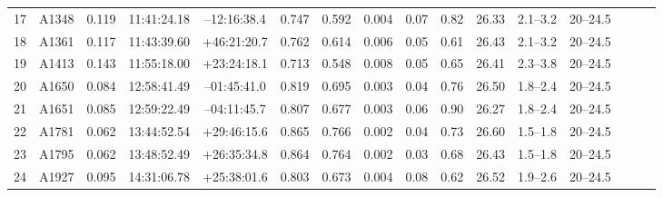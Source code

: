 \documentclass[useAMS,usenatbib]{mnras}
\begin{document}
\begin{table}
\begin{tabular*}{1.0\textwidth}{ l l c c c r c c c c c c c c l l }
17 & A1348 & 0.119 & 11:41:24.18 & \hspace{1.5pt}--\hspace{0.5pt}12:16:38.4 & 0.747 & 0.592 & 0.004 \hspace{8pt}& 0.07 & 0.82 & 26.33 \hspace{8pt}& 2.1--3.2 \hspace{8pt}& 20--24.5 \\
18 & A1361 & 0.117 & 11:43:39.60 & +46:21:20.7 & 0.762 & 0.614 & 0.006 \hspace{8pt}& 0.05 & 0.61 & 26.43 \hspace{8pt}& 2.1--3.2 \hspace{8pt}& 20--24.5 \\
19 & A1413 & 0.143 & 11:55:18.00 & +23:24:18.1 & 0.713 & 0.548 & 0.008 \hspace{8pt}& 0.05 & 0.65 & 26.41 \hspace{8pt}& 2.3--3.8 \hspace{8pt}& 20--24.5 \\
20 & A1650 & 0.084 & 12:58:41.49 & \hspace{1.5pt}--\hspace{0.5pt}01:45:41.0 & 0.819 & 0.695 & 0.003 \hspace{8pt}& 0.04 & 0.76 & 26.50 \hspace{8pt}& 1.8--2.4 \hspace{8pt}& 20--24.5 \\
21 & A1651 & 0.085 & 12:59:22.49 & \hspace{1.5pt}--\hspace{0.5pt}04:11:45.7 & 0.807 & 0.677 & 0.003 \hspace{8pt}& 0.06 & 0.90 & 26.27 \hspace{8pt}& 1.8--2.4 \hspace{8pt}& 20--24.5 \\
22 & A1781 & 0.062 & 13:44:52.54 & +29:46:15.6 & 0.865 & 0.766 & 0.002 \hspace{8pt}& 0.04 & 0.73 & 26.60 \hspace{8pt}& 1.5--1.8 \hspace{8pt}& 20--24.5 \\
23 & A1795 & 0.062 & 13:48:52.49 & +26:35:34.8 & 0.864 & 0.764 & 0.002 \hspace{8pt}& 0.03 & 0.68 & 26.43 \hspace{8pt}& 1.5--1.8 \hspace{8pt}& 20--24.5 \\
24 & A1927 & 0.095 & 14:31:06.78 & +25:38:01.6 & 0.803 & 0.673 & 0.004 \hspace{8pt}& 0.08 & 0.62 & 26.52 \hspace{8pt}& 1.9--2.6 \hspace{8pt}& 20--24.5 \\

\end{tabular*}
\end{table}
\end{document}
